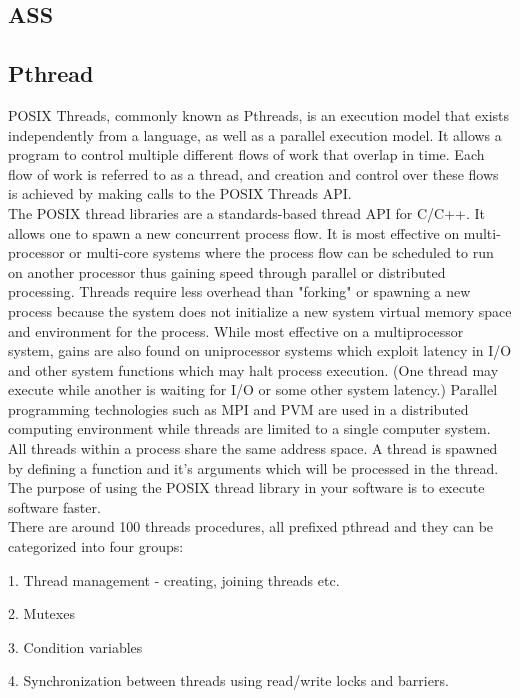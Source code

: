 \documentclass[10pt,twocolumn,letterpaper]{article}
\begin{document}
\subsection{ASS}

\subsection{Pthread}

POSIX Threads, commonly known as Pthreads, is an execution model that exists independently from a language, as well as a parallel execution model. It allows a program to control multiple different flows of work that overlap in time. Each flow of work is referred to as a thread, and creation and control over these flows is achieved by making calls to the POSIX Threads API.\\
The POSIX thread libraries are a standards-based thread API for C/C++. It allows one to spawn a new concurrent process flow. It is most effective on multi-processor or multi-core systems where the process flow can be scheduled to run on another processor thus gaining speed through parallel or distributed processing. Threads require less overhead than "forking" or spawning a new process because the system does not initialize a new system virtual memory space and environment for the process. While most effective on a multiprocessor system, gains are also found on uniprocessor systems which exploit latency in I/O and other system functions which may halt process execution. (One thread may execute while another is waiting for I/O or some other system latency.) Parallel programming technologies such as MPI and PVM are used in a distributed computing environment while threads are limited to a single computer system. All threads within a process share the same address space. A thread is spawned by defining a function and it's arguments which will be processed in the thread. The purpose of using the POSIX thread library in your software is to execute software faster.\\
There are around 100 threads procedures, all prefixed pthread and they can be categorized into four groups:

1.	Thread management - creating, joining threads etc.

2.	Mutexes

3.	Condition variables

4.	Synchronization between threads using read/write locks and barriers.
\end{document}
